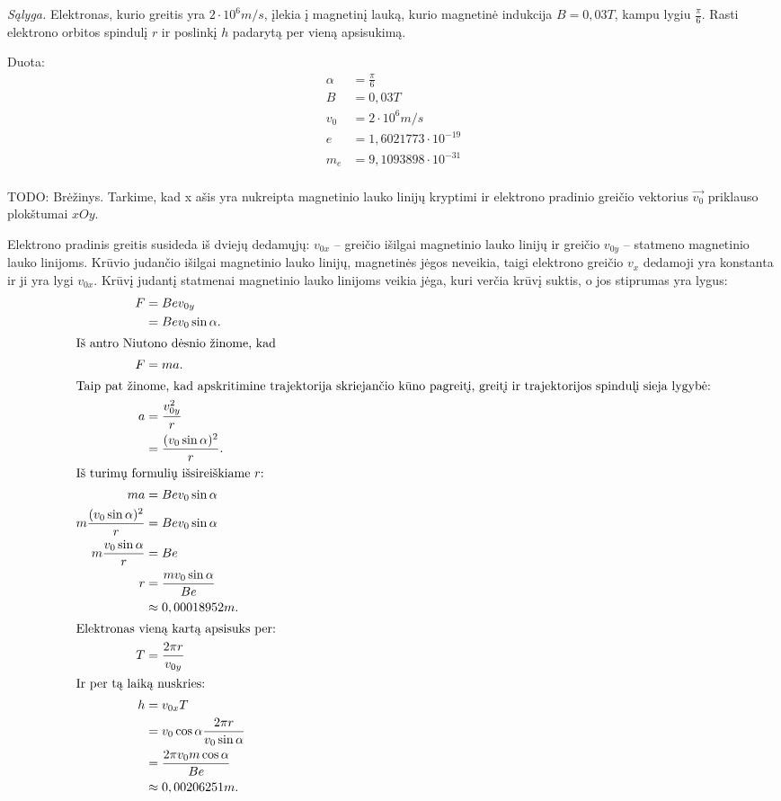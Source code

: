\begin{exmp}
  \emph{Sąlyga.} Elektronas, kurio greitis yra $2 \cdot 10^{6} m/s$,
  įlekia į magnetinį lauką, kurio magnetinė indukcija $B = 0,03T$,
  kampu lygiu $\frac{\pi}{6}$. Rasti elektrono orbitos spindulį $r$
  ir poslinkį $h$ padarytą per vieną apsisukimą.

  Duota:
  \begin{align*}
    \alpha &= \frac{\pi}{6} \\
    B &= 0,03 T \\
    v_{0} &= 2 \cdot 10^{6} m/s \\
    e &= 1,6021773 \cdot 10^{-19} \\
    m_{e} &= 9,1093898 \cdot 10^{-31} \\
  \end{align*}

  TODO: Brėžinys. Tarkime, kad x ašis yra nukreipta magnetinio lauko
  linijų kryptimi ir elektrono pradinio greičio vektorius $\vec{v_{0}}$
  priklauso plokštumai $xOy$.

  Elektrono pradinis greitis susideda iš dviejų dedamųjų: $v_{0x}$ –
  greičio išilgai magnetinio lauko linijų ir greičio $v_{0y}$ –
  statmeno magnetinio lauko linijoms. Krūvio judančio išilgai
  magnetinio lauko linijų, magnetinės jėgos neveikia, taigi elektrono
  greičio $v_{x}$ dedamoji yra konstanta ir ji yra lygi $v_{0x}$.
  Krūvį judantį statmenai magnetinio lauko linijoms veikia jėga,
  kuri verčia krūvį suktis, o jos stiprumas yra lygus:
  \begin{align*}
    F
      &= B e v_{0y} \\
      &= B e v_{0} \sin \alpha. \\
    \intertext{Iš antro Niutono dėsnio žinome, kad}
    F
      &= ma. \\
    \intertext{Taip pat žinome, kad apskritimine trajektorija
    skriejančio kūno pagreitį, greitį ir trajektorijos spindulį
    sieja lygybė:}
    a
      &= \frac{v_{0y}^{2}}{r} \\
      &= \frac{(v_{0} \sin \alpha)^{2}}{r}. \\
    \intertext{Iš turimų formulių išsireiškiame $r$:}
    ma
      &= B e v_{0} \sin \alpha \\
    m \frac{(v_{0} \sin \alpha)^{2}}{r}
      &= B e v_{0} \sin \alpha \\
    m \frac{v_{0} \sin \alpha}{r}
      &= B e \\
    r
      &= \frac{m v_{0} \sin \alpha}{B e} \\
      &\approx 0,00018952 m. \\
    \intertext{Elektronas vieną kartą apsisuks per:}
    T
      &= \frac{2 \pi r}{v_{0y}} \\
    \intertext{Ir per tą laiką nuskries:}
    h
      &= v_{0x} T \\
      &= v_{0} \cos \alpha \frac{2 \pi r}{v_{0} \sin \alpha} \\
      &= \frac{2 \pi v_{0} m \cos \alpha}{Be} \\
      &\approx 0,00206251 m.
  \end{align*}

\end{exmp}

